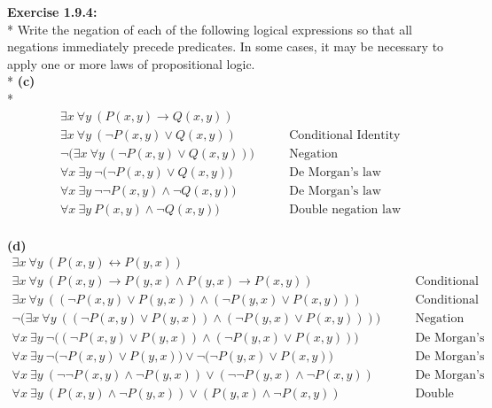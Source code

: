 \documentclass[12pt, letterpaper, twoside]{article}
\begin{document}
\noindent \textbf{Exercise 1.9.4:}\\*
\noindent Write the negation of each of the following logical expressions so that all negations immediately precede predicates. In some cases, it may be necessary to apply one or more laws of propositional logic.\\*
\break
\textbf{(c)}\\*
\break
\begin{align*}
 \exists x\ \forall y\ (P(x, y) \to Q(x, y))\\
 \exists x\ \forall y\ (\neg{P}(x, y) \lor Q(x, y))	&\qquad \text{Conditional Identity}\\
 \neg{(}\exists x\ \forall y\ (\neg{P}(x, y) \lor Q(x, y)))	&\qquad \text{Negation}\\
 \forall x\ \exists y\ \neg{(}\neg{P}(x, y) \lor Q(x, y))	&\qquad	\text{De Morgan's law}\\
 \forall x\ \exists y\ \neg{\neg{P}}(x, y) \land \neg{Q}(x, y)) &\qquad	    \text{De Morgan's law}\\
 \forall x\ \exists y\ P(x, y) \land \neg{Q}(x, y)) &\qquad	\text{Double negation law}\\
 \end{align*}

\newpage
\noindent \textbf{(d)}
\begin{align*}
 \exists x\ \forall y\ (P(x, y) \leftrightarrow P(y, x))	\\
 \exists x\ \forall y\ (P(x, y) \to P(y, x) \land P(y, x) \to P(x, y))	 &\qquad \text{Conditional identity}\\
 \exists x\ \forall y\ ((\neg{P}(x, y) \lor P(y, x)) \land (\neg{P}(y, x) \lor P(x, y)))	  &\qquad \text{Conditional identity}\\
 \neg{(}\exists x\ \forall y\ ((\neg{P}(x, y) \lor P(y, x)) \land (\neg{P}(y, x) \lor P(x, y))))	 &\qquad \text{Negation}\\
 \forall x\ \exists y\ \neg{(}(\neg{P}(x, y) \lor P(y, x)) \land (\neg{P}(y, x) \lor P(x, y))) &\qquad  \text{De Morgan's law}\\
 \forall x\ \exists y\ \neg{(}\neg{P}(x, y) \lor P(y, x)) \lor \neg{(} \neg{P}(y, x) \lor P(x, y))  &\qquad \text{De Morgan's law} \\
 \forall x\ \exists y\ (\neg{\neg{P}}(x, y) \land \neg{P}(y, x)) \lor (\neg{\neg{P}}(y, x) \land \neg{P}(x, y))  &\qquad \text{De Morgan's law} \\
 \forall x\ \exists y\ (P(x, y) \land \neg{P}(y, x)) \lor (P(y, x) \land \neg{P}(x, y))	  &\qquad \text{Double negation law}\\
\end{align*}
\end{document}
